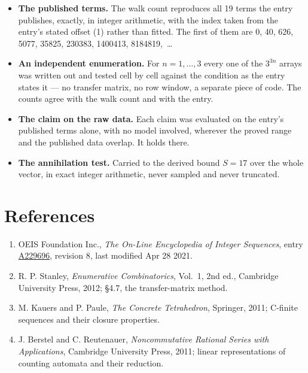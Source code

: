 \documentclass[11pt]{article}
\theoremstyle{definition}
\begin{document}
\begin{itemize}

\item {\bfseries The published terms.} The walk count reproduces all 19 terms the entry publishes, exactly, in integer arithmetic, with the index taken from the entry's stated offset (1) rather than fitted. The first of them are 0, 40, 626, 5077, 35825, 230383, 1400413, 8184819,~\dots

\item {\bfseries An independent enumeration.} For $n = 1,\dots,3$ every one of the $3^{3n}$ arrays was written out and tested cell by cell against the condition as the entry states it --- no transfer matrix, no row window, a separate piece of code. The counts agree with the walk count and with the entry.

\item {\bfseries The claim on the raw data.} Each claim was evaluated on the entry's published terms alone, with no model involved, wherever the proved range and the published data overlap. It holds there.

\item {\bfseries The annihilation test.} Carried to the derived bound $S = 17$ over the whole vector, in exact integer arithmetic, never sampled and never truncated.

\end{itemize}

\section{References}

\begin{enumerate}

\item OEIS Foundation Inc., \emph{The On-Line Encyclopedia of Integer Sequences}, entry \href{https://oeis.org/A229696}{A229696}, revision 8, last modified Apr 28 2021.

\item R. P. Stanley, \emph{Enumerative Combinatorics}, Vol.~1, 2nd ed., Cambridge University Press, 2012; \S4.7, the transfer-matrix method.

\item M. Kauers and P. Paule, \emph{The Concrete Tetrahedron}, Springer, 2011; C-finite sequences and their closure properties.

\item J. Berstel and C. Reutenauer, \emph{Noncommutative Rational Series with Applications}, Cambridge University Press, 2011; linear representations of counting automata and their reduction.

\end{enumerate}
\end{document}
